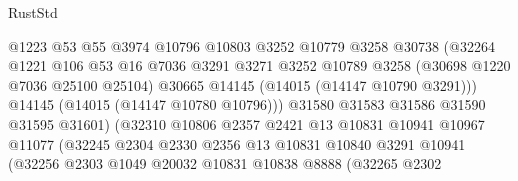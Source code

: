 \begin{lexlean}{RustStd}
\begin{coremodule}
                                    @1223
                                    @53
                                    @55
                                    @3974
                                    @10796
                                    @10803
                                    @3252
                                    @10779
                                    @3258
                                    @30738
                                    (@32264
                                      @1221
                                      @106
                                      @53
                                      @16
                                      @7036
                                      @3291
                                      @3271
                                      @3252
                                      @10789
                                      @3258
                                      (@30698 @1220 @7036 @25100 @25104)
                                      @30665
                                      @14145
                                      (@14015 (@14147 @10790 @3291)))
                                    @14145
                                    (@14015 (@14147 @10780 @10796)))
                                  @31580
                                  @31583
                                  @31586
                                  @31590
                                  @31595
                                  @31601)
                                (@32310
                                  @10806
                                  @2357
                                  @2421
                                  @13
                                  @10831
                                  @10941
                                  @10967
                                  @11077
                                  (@32245
                                    @2304
                                    @2330
                                    @2356
                                    @13
                                    @10831
                                    @10840
                                    @3291
                                    @10941
                                    (@32256
                                      @2303
                                      @1049
                                      @20032
                                      @10831
                                      @10838
                                      @8888
                                      (@32265
                                        @2302

\end{coremodule}
\end{lexlean}

